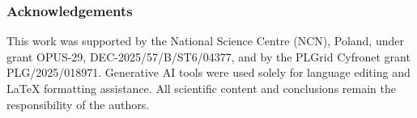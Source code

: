 \documentclass[runningheads]{llncs}
\begin{document}
\begin{abstract}
\end{abstract}










\subsubsection*{Acknowledgements}
This work was supported by the National Science Centre (NCN), Poland, under grant OPUS-29, DEC-2025/57/B/ST6/04377, and by the PLGrid Cyfronet grant PLG/2025/018971. Generative AI tools were used solely for language editing and LaTeX formatting assistance. All scientific content and conclusions remain the responsibility of the authors.


\end{document}
